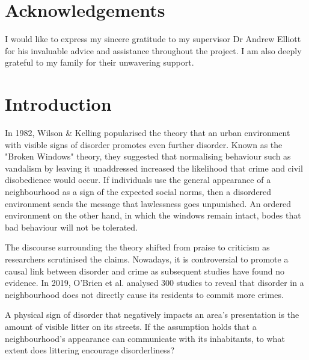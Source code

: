 \documentclass{thesis}
\begin{document}
\chapter*{Acknowledgements}

I would like to express my sincere gratitude to my supervisor Dr Andrew Elliott for his invaluable advice and assistance throughout the project. I am also deeply grateful to my family for their unwavering support.


\listoffigures
\listoftables


\tableofcontents


\chapter{Introduction}

In 1982, Wilson \& Kelling popularised the theory that an urban environment with visible signs of disorder promotes even further disorder. Known as the "Broken Windows" theory, they suggested that normalising behaviour such as vandalism by leaving it unaddressed increased the likelihood that crime and civil disobedience would occur\cite{broken-windows}. If individuals use the general appearance of a neighbourhood as a sign of the expected social norms, then a disordered environment sends the message that lawlessness goes unpunished. An ordered environment on the other hand, in which the windows remain intact, bodes that bad behaviour will not be tolerated.

The discourse surrounding the theory shifted from praise to criticism as researchers scrutinised the claims. Nowadays, it is controversial to promote a causal link between disorder and crime as subsequent studies have found no evidence\cite{OBrien2019LookingTB}. In 2019, O’Brien et al. analysed 300 studies to reveal that disorder in a neighbourhood does not directly cause its residents to commit more crimes.

A physical sign of disorder that negatively impacts an area's presentation is the amount of visible litter on its streets. If the assumption holds that a neighbourhood's appearance can communicate with its inhabitants, to what extent does littering encourage disorderliness?
\end{document}
